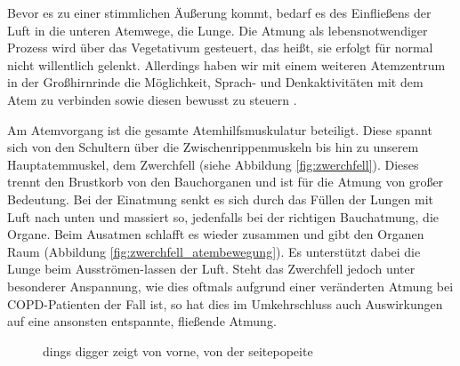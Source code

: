 Bevor es zu einer stimmlichen Äußerung kommt, bedarf es des Einfließens der Luft in die unteren Atemwege, die Lunge. Die Atmung als lebensnotwendiger Prozess wird über das Vegetativum gesteuert, das heißt, sie erfolgt für normal nicht willentlich gelenkt. Allerdings haben wir mit einem weiteren Atemzentrum in der Großhirnrinde die Möglichkeit, Sprach- und Denkaktivitäten mit dem Atem zu verbinden sowie diesen bewusst zu steuern \autocite[vgl.][2]{ehrmann2004}. 

Am Atemvorgang ist die gesamte Atemhilfsmuskulatur beteiligt. Diese spannt sich von den Schultern über die Zwischenrippenmuskeln bis hin zu unserem Hauptatemmuskel, dem Zwerchfell (siehe Abbildung \ref{fig:zwerchfell}). Dieses trennt den Brustkorb von den Bauchorganen und ist für die Atmung von großer Bedeutung. Bei der Einatmung senkt es sich durch das Füllen der Lungen mit Luft nach unten und massiert so, jedenfalls bei der richtigen Bauchatmung, die Organe. Beim Ausatmen schlafft es wieder zusammen und gibt den Organen Raum (Abbildung \ref{fig:zwerchfell_atembewegung}). Es unterstützt dabei die Lunge beim Ausströmen-lassen der Luft. Steht das Zwerchfell jedoch unter besonderer Anspannung, wie dies oftmals aufgrund einer veränderten Atmung bei COPD-Patienten der Fall ist, so hat dies im Umkehrschluss auch Auswirkungen auf eine ansonsten entspannte, fließende Atmung. 

\begin{figure}
  \centering
  \hfill
  \caption[]{dings digger  zeigt von vorne,   von der seitepopeite}
  \label{fig:zwerchfell_gesamt}
\end{figure}


